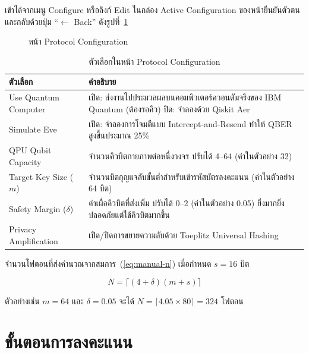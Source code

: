 เข้าได้จากเมนู Configure หรือลิงก์ Edit ในกล่อง Active Configuration ของหน้ายืนยันตัวตน
และกลับด้วยปุ่ม ``$\leftarrow$ Back'' ดังรูปที่~\ref{fig:manual-config}

\begin{figure}[htbp]
\centering
\caption{หน้า Protocol Configuration}
\label{fig:manual-config}
\end{figure}

\begin{table}[htbp]
\centering
\begin{tabular}{|l|p{9.5cm}|}
\hline
\textbf{ตัวเลือก} & \textbf{คำอธิบาย} \\ \hline
Use Quantum Computer & เปิด: ส่งงานไปประมวลผลบนคอมพิวเตอร์ควอนตัมจริงของ IBM Quantum (ต้องรอคิว)
ปิด: จำลองด้วย Qiskit Aer \\ \hline
Simulate Eve & เปิด: จำลองการโจมตีแบบ Intercept-and-Resend ทำให้ QBER สูงขึ้นประมาณ 25\% \\ \hline
QPU Qubit Capacity & จำนวนคิวบิตกายภาพต่อหนึ่งวงจร ปรับได้ 4--64 (ค่าในตัวอย่าง 32) \\ \hline
Target Key Size ($m$) & จำนวนบิตกุญแจลับขั้นต่ำสำหรับเข้ารหัสบัตรลงคะแนน (ค่าในตัวอย่าง 64 บิต) \\ \hline
Safety Margin ($\delta$) & ค่าเผื่อคิวบิตที่ส่งเพิ่ม ปรับได้ 0--2 (ค่าในตัวอย่าง 0.05) ยิ่งมากยิ่งปลอดภัยแต่ใช้คิวบิตมากขึ้น \\ \hline
Privacy Amplification & เปิด/ปิดการขยายความลับด้วย Toeplitz Universal Hashing \\ \hline
\end{tabular}
\caption{ตัวเลือกในหน้า Protocol Configuration}
\label{tab:manual-config}
\end{table}

จำนวนโฟตอนที่ส่งคำนวณจากสมการ~(\ref{eq:manual-n}) เมื่อกำหนด $s = 16$ บิต

\begin{equation}
N = \lceil (4 + \delta)(m + s) \rceil
\label{eq:manual-n}
\end{equation}

ตัวอย่างเช่น $m = 64$ และ $\delta = 0.05$ จะได้ $N = \lceil 4.05 \times 80 \rceil = 324$ โฟตอน


\section{ขั้นตอนการลงคะแนน}

